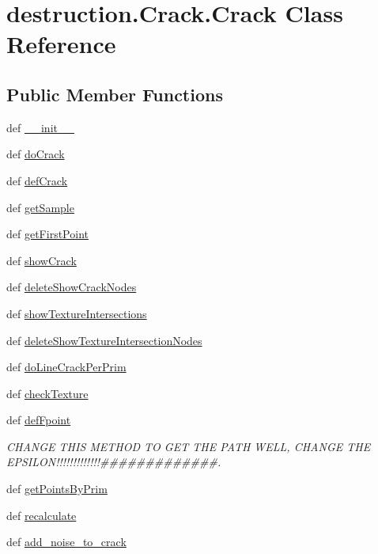 \hypertarget{classdestruction_1_1_crack_1_1_crack}{\section{destruction.\-Crack.\-Crack Class Reference}
\label{classdestruction_1_1_crack_1_1_crack}
}
\subsection*{Public Member Functions}
\begin{DoxyCompactItemize}
\item 
def \hyperlink{classdestruction_1_1_crack_1_1_crack_a33d1529ab8b7eee195b18a56a2fb3c63}{\-\_\-\-\_\-init\-\_\-\-\_\-}
\item 
def \hyperlink{classdestruction_1_1_crack_1_1_crack_a6b939ec36102548d8d72f7ba3abd224f}{do\-Crack}
\item 
def \hyperlink{classdestruction_1_1_crack_1_1_crack_a6cd3fe9f19fb5bae8f038d3b4549c009}{def\-Crack}
\item 
def \hyperlink{classdestruction_1_1_crack_1_1_crack_af478f4079910d42f9cf32f54629425d2}{get\-Sample}
\item 
def \hyperlink{classdestruction_1_1_crack_1_1_crack_a7daabdcde0c9808314af9a8e789cff25}{get\-First\-Point}
\item 
def \hyperlink{classdestruction_1_1_crack_1_1_crack_a6837aa870f136ecc933c59c7e767f0b5}{show\-Crack}
\item 
def \hyperlink{classdestruction_1_1_crack_1_1_crack_af16985b365f746e1a310d8ef19ded991}{delete\-Show\-Crack\-Nodes}
\item 
def \hyperlink{classdestruction_1_1_crack_1_1_crack_af034b130a2287460c2b538900c711485}{show\-Texture\-Intersections}
\item 
def \hyperlink{classdestruction_1_1_crack_1_1_crack_afbf1c36ad0cac7b23eba8f45f74f34cd}{delete\-Show\-Texture\-Intersection\-Nodes}
\item 
def \hyperlink{classdestruction_1_1_crack_1_1_crack_a985cda012b722362630399b80349f202}{do\-Line\-Crack\-Per\-Prim}
\item 
def \hyperlink{classdestruction_1_1_crack_1_1_crack_a2316dc6f7c8621fa8e180bebd1b14677}{check\-Texture}
\item 
def \hyperlink{classdestruction_1_1_crack_1_1_crack_a5a266d2fbbc13f60354db5a33acead78}{def\-Fpoint}
\begin{DoxyCompactList}\small\item\em C\-H\-A\-N\-G\-E T\-H\-I\-S M\-E\-T\-H\-O\-D T\-O G\-E\-T T\-H\-E P\-A\-T\-H W\-E\-L\-L, C\-H\-A\-N\-G\-E T\-H\-E E\-P\-S\-I\-L\-O\-N!!!!!!!!!!!!!\#\#\#\#\#\#\#\#\#\#\#\#\#. \end{DoxyCompactList}\item 
def \hyperlink{classdestruction_1_1_crack_1_1_crack_ad1ee7196fff7feb71ff3501f2afb24be}{get\-Points\-By\-Prim}
\item 
def \hyperlink{classdestruction_1_1_crack_1_1_crack_ac8d33e512edf9c395d1c29b1d92fd9b9}{recalculate}
\item 
def \hyperlink{classdestruction_1_1_crack_1_1_crack_ab67153d842a02ba9aab1843f9c244b30}{add\-\_\-noise\-\_\-to\-\_\-crack}
\end{DoxyCompactItemize}

